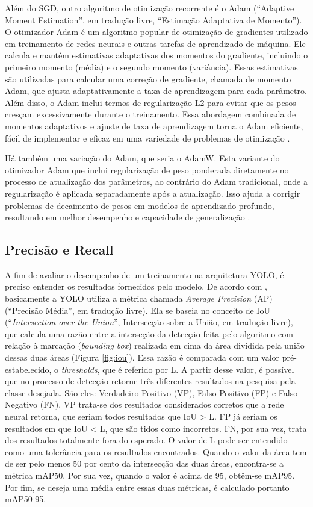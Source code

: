 Além do SGD, outro algoritmo de otimização recorrente é o Adam (“Adaptive Moment Estimation”, em tradução livre, “Estimação Adaptativa de Momento”). O otimizador Adam é um algoritmo popular de otimização de gradientes utilizado em treinamento de redes neurais e outras tarefas de aprendizado de máquina. Ele calcula e mantém estimativas adaptativas dos momentos do gradiente, incluindo o primeiro momento (média) e o segundo momento (variância). Essas estimativas são utilizadas para calcular uma correção de gradiente, chamada de momento Adam, que ajusta adaptativamente a taxa de aprendizagem para cada parâmetro. Além disso, o Adam inclui termos de regularização L2 para evitar que os pesos cresçam excessivamente durante o treinamento. Essa abordagem combinada de momentos adaptativos e ajuste de taxa de aprendizagem torna o Adam eficiente, fácil de implementar e eficaz em uma variedade de problemas de otimização \cite{kingma2014adam}.

Há também uma variação do Adam, que seria o AdamW. Esta variante do otimizador Adam que inclui regularização de peso ponderada diretamente no processo de atualização dos parâmetros, ao contrário do Adam tradicional, onde a regularização é aplicada separadamente após a atualização. Isso ajuda a corrigir problemas de decaimento de pesos em modelos de aprendizado profundo, resultando em melhor desempenho e capacidade de generalização \cite{zhou2024towards}.

\subsection{Precisão e Recall}
\label{sec:precisaorecall}

A fim de avaliar o desempenho de um treinamento na arquitetura YOLO, é preciso entender os resultados fornecidos pelo modelo. De acordo com , basicamente a YOLO utiliza a métrica chamada \textit{Average Precision} (AP) (“Precisão Média”, em tradução livre). Ela se baseia no conceito de IoU (“\textit{Intersection over the Union}”, Intersecção sobre a União, em tradução livre), que calcula uma razão entre a interseção da detecção feita pelo algoritmo com relação à marcação (\textit{bounding box}) realizada em cima da área dividida pela união dessas duas áreas (Figura \ref{fig:iou}). Essa razão é comparada com um valor pré-estabelecido, o \textit{thresholds}, que é referido por L. A partir desse valor, é possível que no processo de detecção retorne três diferentes resultados na pesquisa pela classe desejada. São eles: Verdadeiro Positivo (VP), Falso Positivo (FP) e Falso Negativo (FN). VP trata-se dos resultados considerados corretos que a rede neural retorna, que seriam todos resultados que IoU > L. FP já seriam os resultados em que IoU < L, que são tidos como incorretos. FN, por sua vez, trata dos resultados totalmente fora do esperado. O valor de L pode ser entendido como uma tolerância para os resultados encontrados. Quando o valor da área tem de ser pelo menos 50 por cento da intersecção das duas áreas, encontra-se a métrica mAP50. Por sua vez, quando o valor é acima de 95, obtêm-se mAP95. Por fim, se deseja uma média entre essas duas métricas, é calculado portanto mAP50-95.

